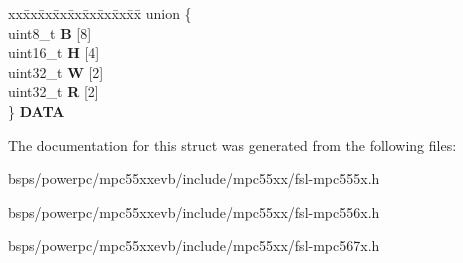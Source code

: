 \begin{DoxyCompactItemize}
\begin{tabbing}
\end{tabbing}\item 
\mbox{\label{structFLEXCAN2__tag_1_1canbuf__t_a5e4649bfe6f071d4a5d7bf64375caab9}} 
\begin{tabbing}
xx\=xx\=xx\=xx\=xx\=xx\=xx\=xx\=xx\=\kill
union \{\\
\>uint8\_t {\bfseries B} \mbox{[}8\mbox{]}\\
\>uint16\_t {\bfseries H} \mbox{[}4\mbox{]}\\
\>uint32\_t {\bfseries W} \mbox{[}2\mbox{]}\\
\>uint32\_t {\bfseries R} \mbox{[}2\mbox{]}\\
\} {\bfseries DATA}\\

\end{tabbing}\end{DoxyCompactItemize}


The documentation for this struct was generated from the following files\+:\begin{DoxyCompactItemize}
\item 
bsps/powerpc/mpc55xxevb/include/mpc55xx/fsl-\/mpc555x.\+h\item 
bsps/powerpc/mpc55xxevb/include/mpc55xx/fsl-\/mpc556x.\+h\item 
bsps/powerpc/mpc55xxevb/include/mpc55xx/fsl-\/mpc567x.\+h\end{DoxyCompactItemize}

